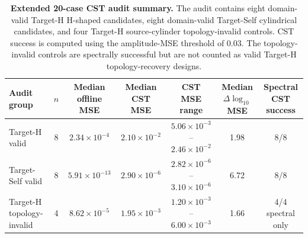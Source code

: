 \documentclass[final,1p,times]{elsarticle}
\begin{document}
\begin{table}[htbp!]
\centering
\caption{\textbf{Extended 20-case CST audit summary.}
The audit contains eight domain-valid Target-H H-shaped candidates, eight domain-valid Target-Self cylindrical candidates, and four Target-H source-cylinder topology-invalid controls. CST success is computed using the amplitude-MSE threshold of 0.03. The topology-invalid controls are spectrally successful but are not counted as valid Target-H topology-recovery designs.}
\label{tab:si_phase5_cst_audit_summary}
\footnotesize
\setlength{\tabcolsep}{4.2pt}
\renewcommand{\arraystretch}{1.12}
\begin{tabular}{lcccccc}
\toprule
Audit group & $n$ & Median offline MSE & Median CST MSE & CST MSE range & Median $\Delta\log_{10}$ MSE & Spectral CST success \\
\midrule
Target-H valid & 8 & $2.34\times10^{-4}$ & $2.10\times10^{-2}$ & $5.06\times10^{-3}$--$2.46\times10^{-2}$ & 1.98 & 8/8 \\
Target-Self valid & 8 & $5.91\times10^{-13}$ & $2.90\times10^{-6}$ & $2.82\times10^{-6}$--$3.10\times10^{-6}$ & 6.72 & 8/8 \\
Target-H topology-invalid & 4 & $8.62\times10^{-5}$ & $1.95\times10^{-3}$ & $1.20\times10^{-3}$--$6.00\times10^{-3}$ & 1.66 & 4/4 spectral only \\
\bottomrule
\end{tabular}
\end{table}
\end{document}
